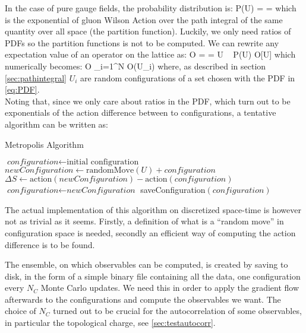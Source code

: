 In the case of pure gauge fields, the probability distribution is:
\beq
\label{eq:PDF}
    P(U) =  = 
\eeq
which is the exponential of gluon Wilson Action over the path integral of the same quantity over all space (the partition function). Luckily, we only need ratios of PDFs so the partition functions is not to be computed. We can rewrite any expectation value of an operator on the lattice as:
\beq
    \langle O \rangle =  = \int  \D U ~ P(U) O[U]
\eeq
which numerically becomes:
\beq
\langle O \rangle \approx {} \sum_{i=1}^N O(U_i)
\eeq
where, as described in section \cref{sec:pathintegral} $U_i$ are random configurations of a set chosen with the PDF in \cref{eq:PDF}. \\
Noting that, since we only care about ratios in the PDF, which turn out to be exponentials of the action difference between to configurations,  a tentative algorithm can be written as: 
\begin{algorithm} [hbt!]
    \caption{Metropolis Algorithm}\label{metropolis:algo}
    \begin{algorithmic}
    \State $\textit{configuration} \gets \text{initial configuration}$
                \State $\textit{newConfiguration}  \gets \text{randomMove}(U) + \textit{configuration}$  
                \State $\Delta S \gets \text{action} (\textit{newConfiguration}) - \text{action} (\textit{configuration})$
                    \State $\textit{configuration} \gets \textit{newConfiguration}$
                \EndIf
            \EndFor 
        \EndFor 
        \State saveConfiguration$(configuration)$
    \EndFor
    \end{algorithmic}  
\end{algorithm} 

The actual implementation of this algorithm on discretized space-time is however not as trivial as it seems. Firstly, a definition of what is a ``random move'' in configuration space is needed, secondly an efficient way of computing the action difference is to be found.

The ensemble, on which observables can be computed, is created by saving to disk, in the form of a simple binary file containing all the data,  one configuration every $N_C$ Monte Carlo updates. We need this in order to apply the gradient flow afterwards to the configurations and compute the observables we want. The choice of $N_C$ turned out to be crucial for the autocorrelation of some observables, in particular the topological charge, see \cref{sec:testautocorr}.

